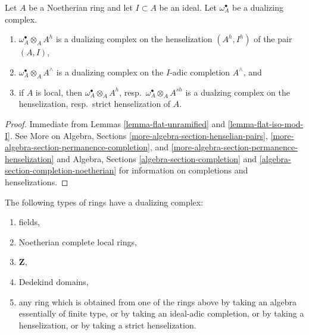\begin{lemma}
\label{lemma-completion-henselization-dualizing}
Let $A$ be a Noetherian ring and let $I \subset A$ be an ideal.
Let $\omega_A^\bullet$ be a dualizing complex.
\begin{enumerate}
\item $\omega_A^\bullet \otimes_A A^h$ is a dualizing complex on the
henselization $(A^h, I^h)$ of the pair $(A, I)$,
\item $\omega_A^\bullet \otimes_A A^\wedge$ is a dualizing complex on
the $I$-adic completion $A^\wedge$, and
\item if $A$ is local, then $\omega_A^\bullet \otimes_A A^h$,
resp.\ $\omega_A^\bullet \otimes_A A^{sh}$ is a dualzing complex
on the henselization, resp.\ strict henselization of $A$.
\end{enumerate}
\end{lemma}

\begin{proof}
Immediate from Lemmas \ref{lemma-flat-unramified} and
\ref{lemma-flat-iso-mod-I}.
See More on Algebra, Sections \ref{more-algebra-section-henselian-pairs},
\ref{more-algebra-section-permanence-completion}, and
\ref{more-algebra-section-permanence-henselization} and
Algebra, Sections \ref{algebra-section-completion} and
\ref{algebra-section-completion-noetherian}
for information on completions and henselizations.
\end{proof}

\begin{lemma}
\label{lemma-ubiquity-dualizing}
The following types of rings have a dualizing complex:
\begin{enumerate}
\item fields,
\item Noetherian complete local rings,
\item $\mathbf{Z}$,
\item Dedekind domains,
\item any ring which is obtained from one of the rings above by
taking an algebra essentially of finite type, or by taking an
ideal-adic completion, or by taking a henselization, 
or by taking a strict henselization.
\end{enumerate}
\end{lemma}

